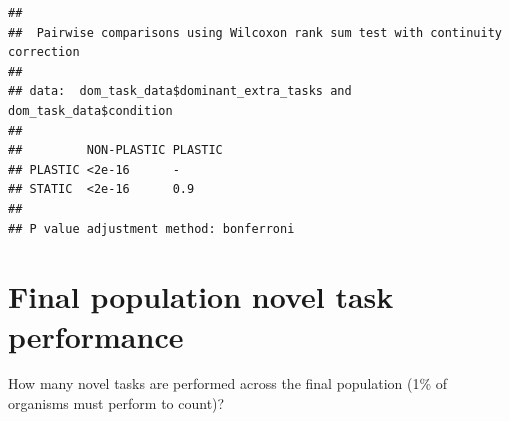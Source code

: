 \documentclass[]{book}
\newenvironment{Shaded}{\begin{snugshade}}{\end{snugshade}}
\newcommand{\DataTypeTok}[1]{\textcolor[rgb]{0.13,0.29,0.53}{#1}}
\newcommand{\FloatTok}[1]{\textcolor[rgb]{0.00,0.00,0.81}{#1}}
\newcommand{\KeywordTok}[1]{\textcolor[rgb]{0.13,0.29,0.53}{\textbf{#1}}}
\newcommand{\NormalTok}[1]{#1}
\newcommand{\OperatorTok}[1]{\textcolor[rgb]{0.81,0.36,0.00}{\textbf{#1}}}
\newcommand{\OtherTok}[1]{\textcolor[rgb]{0.56,0.35,0.01}{#1}}
\newcommand{\StringTok}[1]{\textcolor[rgb]{0.31,0.60,0.02}{#1}}
\begin{document}
\begin{Shaded}
\end{Shaded}

\begin{verbatim}
## 
##  Pairwise comparisons using Wilcoxon rank sum test with continuity correction 
## 
## data:  dom_task_data$dominant_extra_tasks and dom_task_data$condition 
## 
##         NON-PLASTIC PLASTIC
## PLASTIC <2e-16      -      
## STATIC  <2e-16      0.9    
## 
## P value adjustment method: bonferroni
\end{verbatim}

\hypertarget{final-population-novel-task-performance}{%
\section{Final population novel task performance}\label{final-population-novel-task-performance}}

How many novel tasks are performed across the final population (1\% of organisms must perform to count)?
\end{document}
